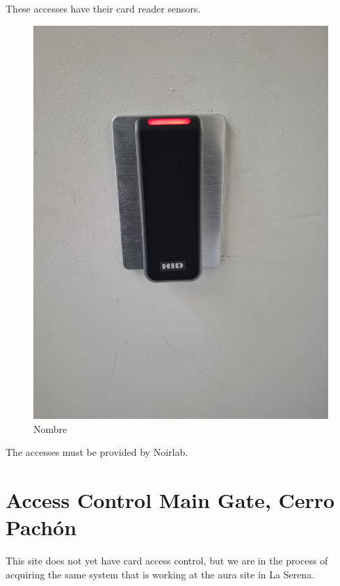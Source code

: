   \newpage

These accesses have their card reader sensors.

\begin{figure}
    \includegraphics[width=12cm]{19.jpg}
    \centering
    \caption*{Nombre}
  \end{figure}

The accesses must be provided by Noirlab.


\section{Access Control Main Gate, Cerro Pachón}

This site does not yet have card access control, but we are in the process of acquiring the same system that is working at the aura site in La Serena.

